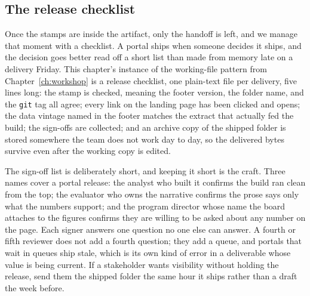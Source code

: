 \subsection{The release checklist}\label{ch12-sc-release}
Once the stamps are inside the artifact, only the handoff is left, and we manage that moment with a checklist. A portal ships when someone decides it ships, and the decision goes better read off a short list than made from memory late on a delivery Friday. This chapter's instance of the working-file pattern from Chapter~\ref{ch:workshop} is a release checklist, one plain-text file per delivery, five lines long: the stamp is checked, meaning the footer version, the folder name, and the \texttt{git} tag all agree; every link on the landing page has been clicked and opens; the data vintage named in the footer matches the extract that actually fed the build; the sign-offs are collected; and an archive copy of the shipped folder is stored somewhere the team does not work day to day, so the delivered bytes survive even after the working copy is edited.

The sign-off list is deliberately short, and keeping it short is the craft. Three names cover a portal release: the analyst who built it confirms the build ran clean from the top; the evaluator who owns the narrative confirms the prose says only what the numbers support; and the program director whose name the board attaches to the figures confirms they are willing to be asked about any number on the page. Each signer answers one question no one else can answer. A fourth or fifth reviewer does not add a fourth question; they add a queue, and portals that wait in queues ship stale, which is its own kind of error in a deliverable whose value is being current. If a stakeholder wants visibility without holding the release, send them the shipped folder the same hour it ships rather than a draft the week before.

